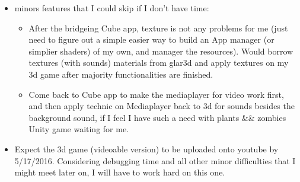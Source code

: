 \documentclass[9pt,b5paper]{article}
\begin{document}
\begin{itemize}
\item minors features that I could skip if I don't have time: 
\begin{itemize}
\item After the bridgeing Cube app, texture is not any problems for me (just need to figure out a simple easier way to build an App manager (or simplier shaders) of my own, and manager the resources). Would borrow textures (with sounds) materials from glar3d and apply textures on my 3d game after majority functionalities are finished.
\item Come back to Cube app to make the mediaplayer for video work first, and then apply technic on Mediaplayer back to 3d for sounds besides the background sound, if I feel I have such a need with plants \&\& zombies Unity game waiting for me.
\end{itemize}
\item Expect the 3d game (videoable version) to be uploaded onto youtube by 5/17/2016. Considering debugging time and all other minor difficulties that I might meet later on, I will have to work hard on this one.
\end{itemize}
\end{document}
